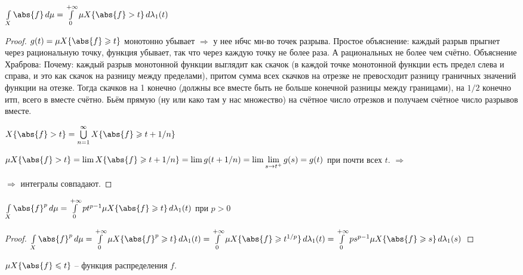 \begin{consequence}
	$\int\limits_X \abs{f}\,d\mu = \int\limits_0^{+\infty}\mu X\{\abs{f} > t\}\,d\lambda_1(t)$
\end{consequence}

\begin{proof}\thmslashn
	
    $g(t) = \mu X\{\abs{f} \geqslant t\}$ монотонно убывает $\Rightarrow$ у нее нбчс мн-во точек разрыва. Простое объяснение: каждый разрыв прыгнет через рациональную точку, функция убывает, так что через каждую точку не более раза. А рациональных не более чем счётно. Объяснение Храброва: Почему: каждый разрыв монотонной функции выглядит как скачок (в каждой точке монотонной функции есть предел слева и справа, и это как скачок на разницу между пределами), притом сумма всех скачков на отрезке не превосходит разницу граничных значений функции на отезке. Тогда скачков на 1 конечно (должны все вместе быть не больше конечной разницы между границами), на $1/2$ конечно итп, всего в вместе счётно. Бьём прямую (ну или како там у нас множество) на счётное число отрезков и получаем счётное число разрывов вместе.
	
	$X\{\abs{f} > t\} = \bigcup\limits_{n=1}^{\infty} X\{\abs{f} \geqslant t + 1/n\}$
	
    $\mu X\{\abs{f} > t\} = \lim X\{\abs{f} \geqslant t + 1/n\} = \lim g(t + 1/n) = \lim\lim\limits_{s\to t^+} g(s) = g(t)$ при почти всех $t$. $\Rightarrow$ 
	
	$\Rightarrow$ интегралы совпадают.
	
\end{proof}


\begin{consequence}
	$\int\limits_X \abs{f}^p\,d\mu = \int\limits_0^{+\infty}pt^{p-1}\mu X\{\abs{f} \geqslant t\}\,d\lambda_1(t)$ при $p>0$
\end{consequence}

\begin{proof}\thmslashn
	
	$\int\limits_X \abs{f}^p\,d\mu = \int\limits_0^{+\infty}\mu X\{\abs{f}^p \geqslant t\}\,d\lambda_1(t) = \int\limits_0^{+\infty}\mu X\{\abs{f} \geqslant t^{1/p}\}\,d\lambda_1(t) = \int\limits_0^{+\infty}ps^{p-1} \mu X\{\abs{f} \geqslant s\}\,d\lambda_1(s)$
	
\end{proof}

\begin{remark}
	$\mu X\{\abs{f} \leqslant t\}$ -- функция распределения $f$.
\end{remark}